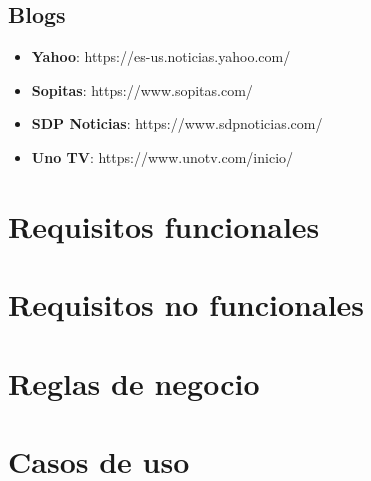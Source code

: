 \subsection{Blogs}
\begin{itemize}
  \item \textbf{Yahoo}: https://es-us.noticias.yahoo.com/
  \item \textbf{Sopitas}: https://www.sopitas.com/
  \item \textbf{SDP Noticias}: https://www.sdpnoticias.com/
  \item \textbf{Uno TV}: https://www.unotv.com/inicio/
\end{itemize}

\section[Requisitos f.]{Requisitos funcionales}


\section[Requisitos no f.]{Requisitos no funcionales}


\section{Reglas de negocio}



\newpage
\section{Casos de uso}


\newpage


  \newpage
  

  \newpage
  \newpage

